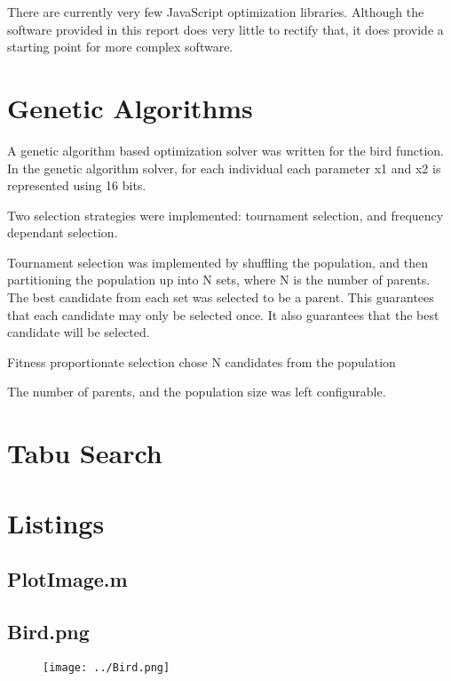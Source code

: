 \documentclass[a4paper,12pt]{article}
\begin{document}
There are currently very few JavaScript optimization libraries. 
Although the software provided in this report does very little to rectify that, it does provide a starting point for more complex software. 

\section{Genetic Algorithms}

A genetic algorithm based optimization solver was written for the bird function.
In the genetic algorithm solver, for each individual each parameter x1 and x2 is represented using 16 bits. 
 
Two selection strategies were implemented: tournament selection, and frequency dependant selection. 

Tournament selection was implemented by shuffling the population, and then partitioning the population up into N sets, where N is the number of parents. The best candidate from each set was selected to be a parent.
This guarantees that each candidate may only be selected once. 
It also guarantees that the best candidate will be selected.

Fitness proportionate selection chose N candidates from the population 

The number of parents, and the population size was left configurable. 

\section{Tabu Search}


\newpage
\appendix

\section{ Listings }
\subsection{PlotImage.m}



\subsection{ Bird.png }

\begin{figure}[H]
\centering
\texttt{[image: ../Bird.png]}
\end{figure}
\end{document}
